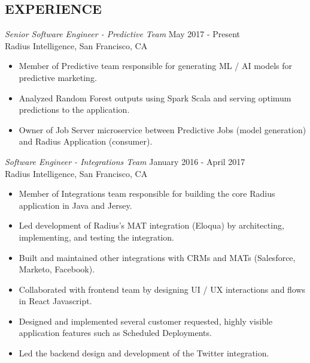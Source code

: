 \documentclass[overlapped, 10pt]{res} %
\begin{document}
\begin{resume}

 


 
\section{EXPERIENCE}\smallskip

{\sl Senior Software Engineer - Predictive Team} \hfill May 2017 - Present \\
Radius Intelligence, San Francisco, CA
\begin{itemize}
\item Member of Predictive team responsible for generating ML / AI models for predictive marketing.
\item Analyzed Random Forest outputs using Spark Scala and serving optimum predictions to the application.
\item Owner of Job Server microservice between Predictive Jobs (model generation) and Radius Application (consumer).
\end{itemize} 

{\sl Software Engineer - Integrations Team} \hfill January 2016 - April 2017 \\
Radius Intelligence, San Francisco, CA
\begin{itemize} \itemsep -2pt %
\item Member of Integrations team responsible for building the core Radius application in Java and Jersey.
\item Led development of Radius’s MAT integration (Eloqua) by architecting, implementing, and testing the integration.
\item Built and maintained other integrations with CRMs and MATs (Salesforce, Marketo, Facebook).
\item Collaborated with frontend team by designing UI / UX interactions and flows in React Javascript.
\item Designed and implemented several customer requested, highly visible application features such as Scheduled Deployments.
\item Led the backend design and development of the Twitter integration.
\end{itemize}
 

\end{resume}
\end{document}

